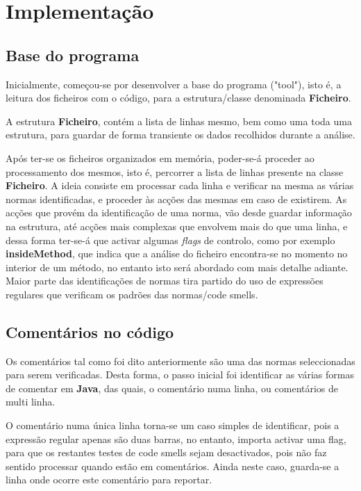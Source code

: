 \chapter{Implementação}
\section{Base do programa}
\hspace{5mm} Inicialmente, começou-se por desenvolver a base do programa ("tool"), isto é, a leitura dos ficheiros com o código, para a estrutura/classe denominada \textbf{Ficheiro}. 

\hspace{5mm} A estrutura \textbf{Ficheiro}, contém a lista de linhas mesmo, bem como uma toda uma estrutura, para guardar de forma transiente os dados recolhidos durante a análise. 

\hspace{5mm} Após ter-se os ficheiros organizados em memória, poder-se-á proceder ao processamento dos mesmos, isto é, percorrer a lista de linhas presente na classe \textbf{Ficheiro}. A ideia consiste em processar cada linha e verificar na mesma as várias normas identificadas, e proceder às acções das mesmas em caso de existirem. As acções que provém da identificação de uma norma, vão desde guardar informação na estrutura, até acções mais complexas que envolvem mais do que uma linha, e dessa forma ter-se-á que activar algumas \textit{flags} de controlo, como por exemplo \textbf{insideMethod}, que indica que a análise do ficheiro encontra-se no momento no interior de um método, no entanto isto será abordado com mais detalhe adiante. Maior parte das identificações de normas tira partido do uso de expressões regulares que verificam os padrões das normas/code smells.

\section{Comentários no código}
\hspace{5mm} Os comentários tal como foi dito anteriormente são uma das normas seleccionadas para serem verificadas. Desta forma, o passo inicial foi identificar as várias formas de comentar em \textbf{Java}, das quais, o comentário numa linha, ou comentários de multi linha. 

O comentário numa única linha torna-se um caso simples de identificar, pois a expressão regular apenas são duas barras, no entanto, importa activar uma flag, para que os restantes testes de code smells sejam desactivados, pois não faz sentido processar quando estão em comentários. Ainda neste caso, guarda-se a linha onde ocorre este comentário para reportar.

